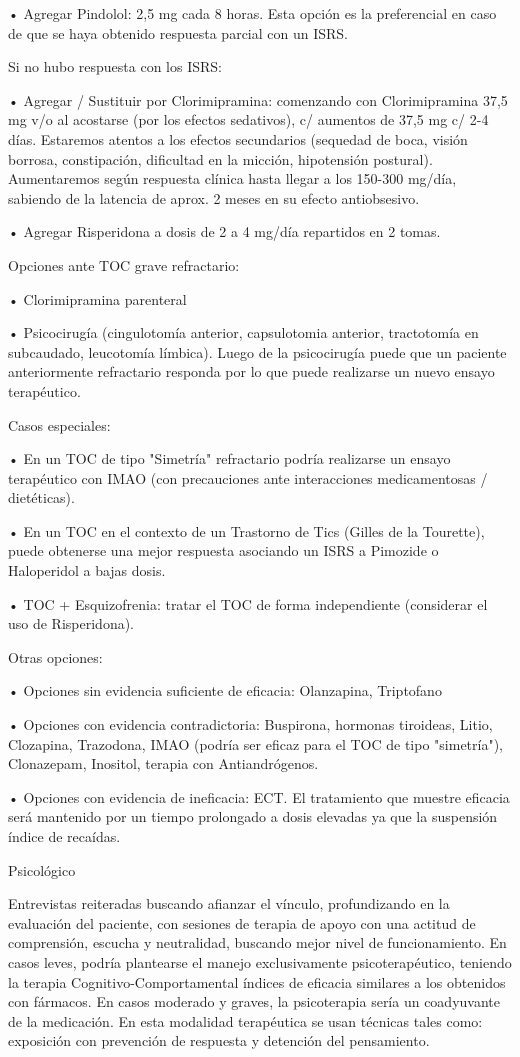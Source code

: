 • Agregar Pindolol: 2,5 mg cada 8 horas. Esta opción es la preferencial en caso de que se haya obtenido respuesta parcial con un ISRS.

Si no hubo respuesta con los ISRS:

• Agregar / Sustituir por Clorimipramina: comenzando con Clorimipramina 37,5 mg v/o al acostarse (por los efectos sedativos), c/ aumentos de 37,5 mg c/ 2-4 días. Estaremos atentos a los efectos secundarios (sequedad de boca, visión borrosa, constipación, dificultad en la micción, hipotensión postural). Aumentaremos según respuesta clínica hasta llegar a los 150-300 mg/día, sabiendo de la latencia de aprox. 2 meses en su efecto antiobsesivo.

• Agregar Risperidona a dosis de 2 a 4 mg/día repartidos en 2 tomas.

Opciones ante TOC grave refractario:

• Clorimipramina parenteral

• Psicocirugía (cingulotomía anterior, capsulotomia anterior, tractotomía en subcaudado, leucotomía límbica). Luego de la psicocirugía puede que un paciente anteriormente refractario responda por lo que puede realizarse un nuevo ensayo terapéutico.

Casos especiales:

• En un TOC de tipo "Simetría" refractario podría realizarse un ensayo terapéutico con IMAO (con precauciones ante interacciones medicamentosas / dietéticas).

• En un TOC en el contexto de un Trastorno de Tics (Gilles de la Tourette), puede obtenerse una mejor respuesta asociando un ISRS a Pimozide o Haloperidol a bajas dosis.

• TOC + Esquizofrenia: tratar el TOC de forma independiente (considerar el uso de Risperidona).

Otras opciones:

• Opciones sin evidencia suficiente de eficacia: Olanzapina, Triptofano

• Opciones con evidencia contradictoria: Buspirona, hormonas tiroideas, Litio, Clozapina, Trazodona, IMAO (podría ser eficaz para el TOC de tipo "simetría"), Clonazepam, Inositol, terapia con Antiandrógenos.

• Opciones con evidencia de ineficacia: ECT. El tratamiento que muestre eficacia será mantenido por un tiempo prolongado a dosis elevadas ya que la suspensión índice de recaídas.

Psicológico

Entrevistas reiteradas buscando afianzar el vínculo, profundizando en la evaluación del paciente, con sesiones de terapia de apoyo con una actitud de comprensión, escucha y neutralidad, buscando mejor nivel de funcionamiento. En casos leves, podría plantearse el manejo exclusivamente psicoterapéutico, teniendo la terapia Cognitivo-Comportamental índices de eficacia similares a los obtenidos con fármacos. En casos moderado y graves, la psicoterapia sería un coadyuvante de la medicación. En esta modalidad terapéutica se usan técnicas tales como: exposición con prevención de respuesta y detención del pensamiento.

